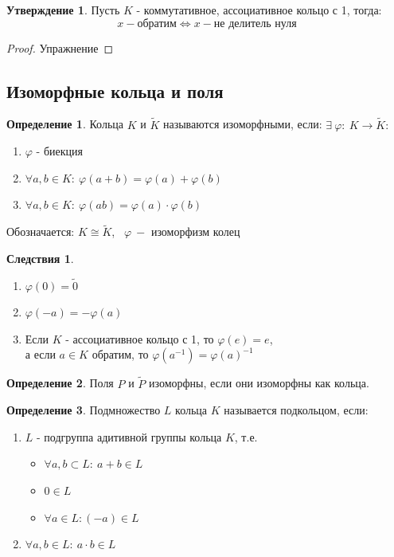 \documentclass[a4paper, 12pt]{article}
\renewcommand{\phi}{\varphi}
\newcommand\tab[1][.5cm]{\hspace*{#1}}
\theoremstyle{definition}
\newtheorem*{definition}{Определение}
\newtheorem*{consequenses}{Следствия}
\newtheorem*{subtheorem}{Утверждение}
\begin{document}
  \begin{subtheorem}
    Пусть $K$ - коммутативное, ассоциативное кольцо с 1, тогда: $$x - \text{обратим} \Longleftrightarrow x - \text{не делитель нуля}$$  
  \end{subtheorem} 
  \begin{proof}
    Упражнение
  \end{proof}
  \subsection{Изоморфные кольца и поля}
  \begin{definition}
    Кольца $K$ и $\widetilde{K}$ называются изоморфными, если: 
    $\exists \ \phi: \ K \to \widetilde{K}:$
    \begin{enumerate}
      \item $\phi$ - биекция
      \item $\forall a, b \in K: \ \phi(a+b) = \phi(a)+\phi(b)$
      \item $\forall a, b \in K: \ \phi(ab) = \phi(a)\cdot \phi(b)$ 
    \end{enumerate}
    Обозначается: $K\cong \widetilde{K}$, \ $\phi \ - $ изоморфизм колец 
  \end{definition} 
  \begin{consequenses}\tab
    \begin{enumerate}
      \item $\phi(0) = \widetilde{0}$
      \item $\phi(-a) = -\phi(a)$
      \item Если $K$ - ассоциативное кольцо с 1, то $\phi(e) = e$, \\а если $a \in K$ обратим, то $\phi(a^{-1}) = \phi(a)^{-1}$
    \end{enumerate}
  \end{consequenses} 
  \begin{definition}
    Поля $P$ и $\widetilde{P}$  изоморфны, если они изоморфны как кольца.
  \end{definition} 
  \begin{definition}
    Подмножество $L$ кольца $K$ называется подкольцом, если:
    \begin{enumerate}
      \item $L$ - подгруппа адитивной группы кольца $K$, т.е.
      \begin{itemize}
        \item $\forall a, b \subset L : \ a + b \in L$ 
        \item $0 \in L$ 
        \item $\forall a \in L: (-a) \in L$
      \end{itemize}
      \item $\forall a, b \in L: \ a \cdot b \in L$    
    \end{enumerate}
  \end{definition} 
\end{document}
